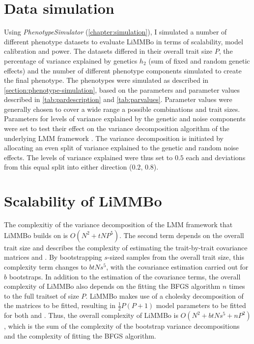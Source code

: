 \section{Data simulation}
\label{section:data-limmbo}
Using \textit{PhenotypeSimulator} (\cref{chapter:simulation}), I simulated a number of different phenotype datasets to evaluate LiMMBo in terms of scalability, model calibration and power. The datasets differed in their overall trait size \(P\), the percentage of variance explained by genetics \(h_2\) (sum of fixed and random genetic effects) and the number of different phenotype components simulated to create the final phenotype. The phenotypes were simulated as described in \cref{section:phenotype-simulation}, based on the parameters and parameter values described in \cref{tab:pardescription} and \cref{tab:parvalues}. Parameter values were generally chosen to cover a wide range a possible combinations and trait sizes. Parameters for levels of variance explained by the genetic and noise components were set to test their effect on the variance decomposition algorithm of the underlying LMM framework \citep{Casale2015}. The variance decomposition is initiated by allocating an even split of variance explained to the genetic and random noise effects. The levels of variance explained were thus set to \(0.5\) each and deviations from this equal split into either direction (\(0.2\), \(0.8\)). 
%

\section{Scalability of LiMMBo}
\label{section:scalability-limmbo}
The complexitiy of the variance decomposition of the LMM framework that LiMMBo builds on is \(O(N^2 + tNP^5)\). The second term depends on the overall trait size and describes the complexity of estimating the trait-by-trait covariance matrices   and  . By bootstrapping \(s\)-sized samples from the overall trait size, this complexity term changes to \(btNs^5\), with the covariance estimation carried out for \(b\) bootstraps. In addition to the estimation of the covariance terms, the overall complexity of LiMMBo also depends on the fitting the BFGS algorithm \(n\) times to the full traitset of size \(P\). LiMMBo makes use of a cholesky decomposition of the matrices to be fitted, resulting in $\frac{1}{2}P(P+1)$ model parameters to be fitted for both   and  . Thus, the overall complexity of LiMMBo is \(O(N^2 + btNs^5 + nP^2)\), which is the sum of the complexity of the bootstrap variance decompositions and the complexity of fitting the BFGS algorithm.  

